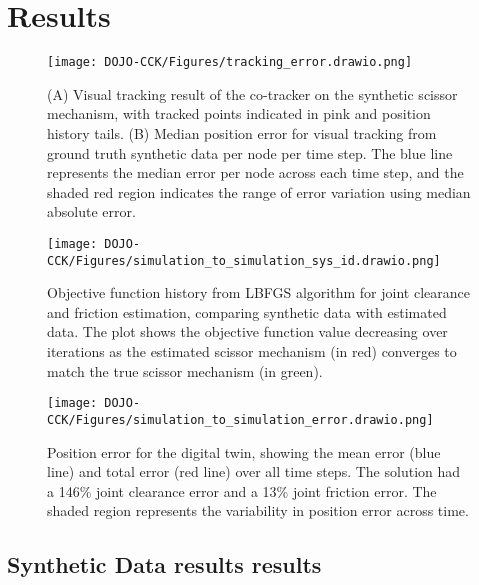 \section{Results} \label{results}
\begin{figure}
    \centering
    \texttt{[image: DOJO-CCK/Figures/tracking\_error.drawio.png]}
    \caption{ (A) Visual tracking result of the co-tracker on the synthetic scissor mechanism, with tracked points indicated in pink and position history tails. (B) Median position error for visual tracking from ground truth synthetic data per node per time step. The blue line represents the median error per node across each time step, and the shaded red region indicates the range of error variation using median absolute error.}
    \label{fig:sim_to_sim-tracking}
    
\end{figure}
\begin{figure}
    \centering
    \texttt{[image: DOJO-CCK/Figures/simulation\_to\_simulation\_sys\_id.drawio.png]}
    \caption{Objective function history from LBFGS algorithm for joint clearance and friction estimation, comparing synthetic data with estimated data. The plot shows the objective function value decreasing over iterations as the estimated scissor mechanism (in red) converges to match the true scissor mechanism (in green).}
    \label{fig:sim_to_sim-LBFGS}
\end{figure}
\begin{figure}
    \centering
    \texttt{[image: DOJO-CCK/Figures/simulation\_to\_simulation\_error.drawio.png]}
    \caption{Position error for the digital twin, showing the mean error (blue line) and total error (red line) over all time steps. The solution had a 146\% joint clearance error and a 13\% joint friction error. The shaded region represents the variability in position error across time.}
    \label{fig:sim_to_sim-Error}
\end{figure}
\subsection{Synthetic Data results results}
